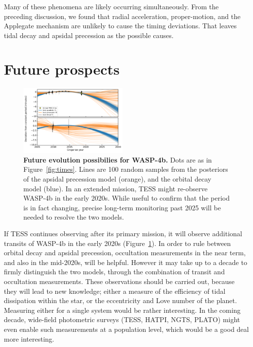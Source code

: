 \documentclass[12pt,twocolumn,tighten]{aastex62}
\begin{document}
Many of these phenomena are likely occurring simultaneously.  From the
preceding discussion, we found that radial acceleration, proper-motion,
and the Applegate mechanism
are unlikely to cause the timing deviations.
That leaves tidal decay and apsidal
precession as the possible causes.



\section{Future prospects}
\label{sec:future}

\begin{figure}[!t]
	\begin{center}
		\leavevmode
		\includegraphics[width=0.48\textwidth]{f5.pdf}
	\end{center}
  \vspace{-0.5cm}
	\caption{
		{\bf Future evolution possibilies for WASP-4b.}
		Dots are as in Figure~\ref{fig:times}.
		Lines are 100 random samples from the posteriors of the apsidal
		precession model (orange), and the orbital decay model (blue).
		In an extended mission, TESS might re-observe WASP-4b in the early
		2020s. While useful to confirm that the period is
		in fact changing, precise long-term monitoring past 2025 will
		be needed to resolve the two models.
		\label{fig:future}
	}
\end{figure}

If TESS continues observing after
its primary mission, 
it will observe additional transits of WASP-4b in the
early 2020s (Figure~\ref{fig:future}).
In order to rule between orbital decay and
apsidal precession, occultation measurements in the
near term, and also in the mid-2020s, will be helpful.
However it may take up to a decade to firmly distinguish
the two models, through the combination of transit and occultation
measurements.
These observations should be carried out, because they will
lead to new knowledge; either a
measure of the efficiency of tidal dissipation within the
star, or the eccentricity and Love number of the planet.
Measuring either for a single system would be
rather interesting.
In the coming decade, wide-field photometric surveys
(TESS, HATPI, NGTS, PLATO)
might even enable such measurements at a population
level, which would be a good deal more interesting.
\end{document}
